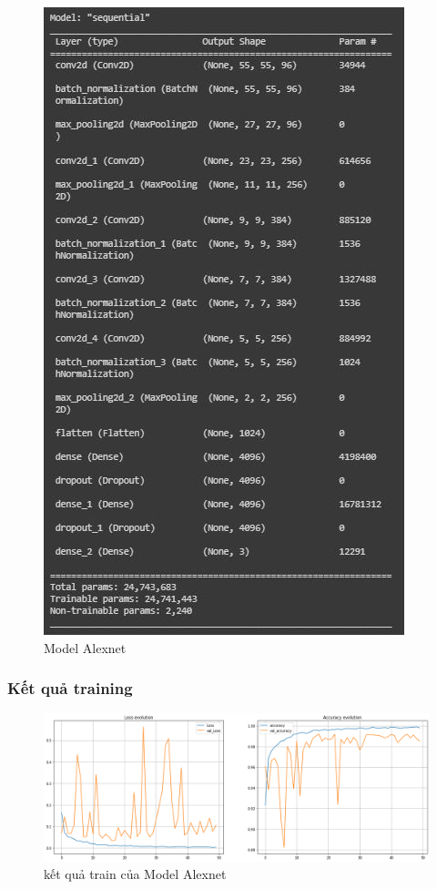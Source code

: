 \newpage
\begin{center}
    \begin{figure}[!h]
        \centering
        \includegraphics[scale = 1]{fileanh/33.jpg}
        \caption{Model Alexnet}
    \end{figure}
\end{center}



\subsubsection{Kết quả training}
\begin{center}
    \begin{figure}[!h]
        \centering
        \includegraphics[scale = 0.4]{fileanh/34.png}
        \caption{kết quả train của Model Alexnet}
    \end{figure}
\end{center}
